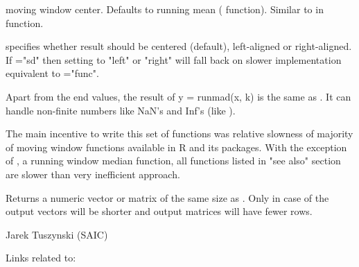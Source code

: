 \begin{Arguments}
\begin{ldescription}
\item[\code{center}] moving window center. Defaults 
to running mean ( function). Similar to   
in  function. 
\item[\code{align}] specifies whether result should be centered (default), 
left-aligned or right-aligned.  If ="sd" then setting
 to "left" or "right" will fall back on slower implementation 
equivalent to ="func". 
\end{ldescription}
\end{Arguments}
\begin{Details}\relax
Apart from the end values, the result of y = runmad(x, k) is the same as 
. It can handle 
non-finite numbers like NaN's and Inf's (like ).

The main incentive to write this set of functions was relative slowness of 
majority of moving window functions available in R and its packages.  With the 
exception of , a running window median function, all 
functions listed in "see also" section are slower than very inefficient 
 approach.
\end{Details}
\begin{Value}
Returns a numeric vector or matrix of the same size as . Only in case of 
 the output vectors will be shorter and output matrices 
will have fewer rows.
\end{Value}
\begin{Author}\relax
Jarek Tuszynski (SAIC) 
\end{Author}
\begin{SeeAlso}\relax
Links related to:
\end{SeeAlso}
